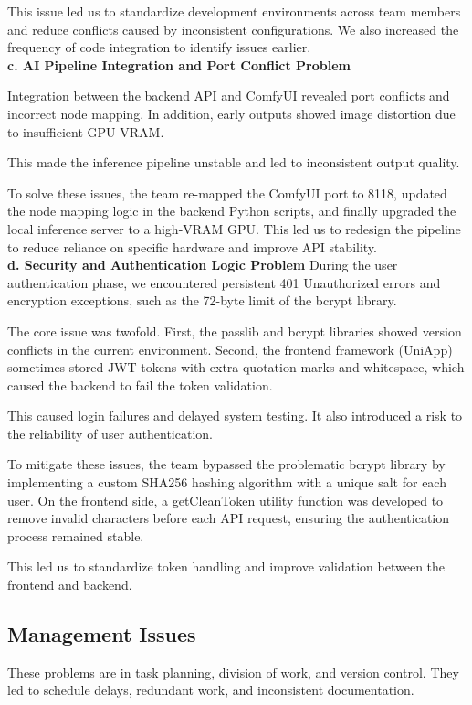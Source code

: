 This issue led us to standardize development environments across team members and reduce conflicts caused by inconsistent configurations. We also increased the frequency of code integration to identify issues earlier.\\

\textbf{\large c. AI Pipeline Integration and Port Conflict Problem}  

Integration between the backend API and ComfyUI revealed port conflicts and incorrect node mapping. In addition, early outputs showed image distortion due to insufficient GPU VRAM.

This made the inference pipeline unstable and led to inconsistent output quality.

To solve these issues, the team re-mapped the ComfyUI port to 8118, updated the node mapping logic in the backend Python scripts, and finally upgraded the local inference server to a high-VRAM GPU. This led us to redesign the pipeline to reduce reliance on specific hardware and improve API stability.\\

\textbf{\large d. Security and Authentication Logic Problem}  
During the user authentication phase, we encountered persistent 401 Unauthorized errors and encryption exceptions, such as the 72-byte limit of the bcrypt library.

The core issue was twofold. First, the passlib and bcrypt libraries showed version conflicts in the current environment. Second, the frontend framework (UniApp) sometimes stored JWT tokens with extra quotation marks and whitespace, which caused the backend to fail the token validation.

This caused login failures and delayed system testing. It also introduced a risk to the reliability of user authentication.

To mitigate these issues, the team bypassed the problematic bcrypt library by implementing a custom SHA256 hashing algorithm with a unique salt for each user. On the frontend side, a getCleanToken utility function was developed to remove invalid characters before each API request, ensuring the authentication process remained stable.

This led us to standardize token handling and improve validation between the frontend and backend.


\subsection{Management Issues}
These problems are in task planning, division of work, and version control. They led to schedule delays, redundant work, and inconsistent documentation.

